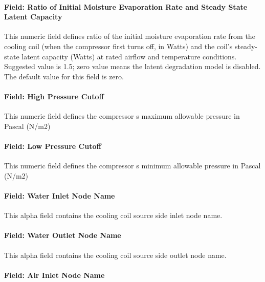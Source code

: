 \paragraph{Field: Ratio of Initial Moisture Evaporation Rate and Steady State Latent Capacity}\label{field-ratio-of-initial-moisture-evaporation-rate-and-steady-state-latent-capacity-3}

This numeric field defines ratio of the initial moisture evaporation rate from the cooling coil (when the compressor first turns off, in Watts) and the coil's steady-state latent capacity (Watts) at rated airflow and temperature conditions. Suggested value is 1.5; zero value means the latent degradation model is disabled. The default value for this field is zero.

\paragraph{Field: High Pressure Cutoff}\label{field-high-pressure-cutoff}

This numeric field defines the compressor s maximum allowable pressure in Pascal (N/m2)

\paragraph{Field: Low Pressure Cutoff}\label{field-low-pressure-cutoff}

This numeric field defines the compressor s minimum allowable pressure in Pascal (N/m2)

\paragraph{Field: Water Inlet Node Name}\label{field-water-inlet-node-name-5-000}

This alpha field contains the cooling coil source side inlet node name.

\paragraph{Field: Water Outlet Node Name}\label{field-water-outlet-node-name-5-000}

This alpha field contains the cooling coil source side outlet node name.

\paragraph{Field: Air Inlet Node Name}\label{field-air-inlet-node-name-16}

